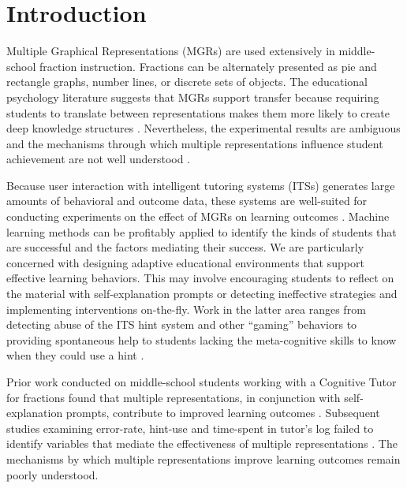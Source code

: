\documentclass{edm_template}
\begin{document}

\section{Introduction}
\label{sec:introduction}

Multiple Graphical Representations (MGRs) are used extensively in middle-school fraction instruction.  Fractions can be alternately presented as pie and rectangle graphs, number lines, or discrete sets of objects. The educational psychology literature suggests that MGRs support transfer because requiring students to translate between representations makes them more likely to create deep knowledge structures \cite{Ambrose2010}. Nevertheless, the experimental results are ambiguous \cite{Ainsworth1999} and the mechanisms through which multiple representations influence student achievement are not well understood \cite{Ainsworth2006}. 

Because user interaction with intelligent tutoring systems (ITSs) generates large amounts of behavioral and outcome data, these systems are well-suited for conducting experiments on the effect of MGRs on learning outcomes \cite{Newell1981}. Machine learning methods can be profitably applied to identify the kinds of students that are successful and the factors mediating their success. We are particularly concerned with designing adaptive educational environments that support effective learning behaviors. This may involve encouraging students to reflect on the material with self-explanation prompts \cite{Rau2009} or detecting ineffective strategies and implementing interventions on-the-fly. Work in the latter area ranges from detecting abuse of the ITS hint system and other ``gaming'' behaviors \cite{Baker2009,Baker2009b} to providing spontaneous help to students lacking the meta-cognitive skills to know when they could use a hint \cite{Aleven2000,Aleven2003,Aleven2006}.

Prior work conducted on middle-school students working with a Cognitive Tutor for fractions found that multiple representations, in conjunction with self-explanation prompts, contribute to improved learning outcomes \cite{Rau2009}. Subsequent studies examining error-rate, hint-use and time-spent in tutor's log failed to identify variables that mediate the effectiveness of multiple representations \cite{Rau2012}. The mechanisms by which multiple representations improve learning outcomes remain poorly understood.
\end{document}
